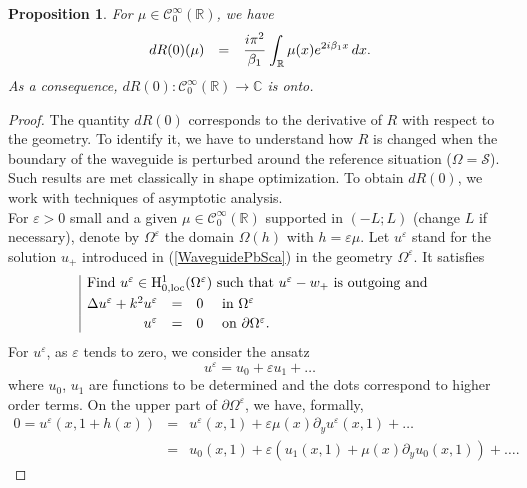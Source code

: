 \documentclass[11pt,a4paper]{report}
\newcommand{\dsp}{\displaystyle}
\newcommand{\eps}{\varepsilon}
\newcommand{\Om}{\Omega}
\newcommand{\mrm}[1]{\mathrm{#1}}
\newcommand{\Cplx}{\mathbb{C}}
\newcommand{\R}{\mathbb{R}}
\newcommand{\mH}{\mrm{H}}
\newcommand{\loc}{\mbox{\scriptsize loc}}
\newtheorem{proposition}[theorem]{Proposition}
\begin{document}
\begin{proposition}\label{PropoDiffR_Dirichlet}
For $\mu\in\mathscr{C}^\infty_0(\R)$, we have
\[
\begin{array}{rcl}
dR(0)(\mu)&=&\dsp\cfrac{i \pi^2}{\beta_1}\,\int_{\R}\mu(x) e^{2i\beta_1x}\,dx.
\end{array}
\]
As a consequence, $dR(0):\mathscr{C}^\infty_0(\R)\to\Cplx$ is onto.
\end{proposition}
\begin{proof}
The quantity $dR(0)$ corresponds to the derivative of $R$ with respect to the geometry. To identify it, we have to understand how $R$ is changed when the boundary of the waveguide is perturbed around the reference situation ($\Om=\mathcal{S}$). Such results are met classically in shape optimization. To obtain $dR(0)$, we work with techniques of asymptotic analysis.\\
\newline
For $\eps>0$ small and a given $\mu\in\mathscr{C}^\infty_0(\R)$ supported in $(-L;L)$ (change $L$ if necessary), denote by $\Om^\eps$ the domain $\Om(h)$ with $h=\eps\mu$. Let $u^\eps$ stand for the solution $u_+$ introduced in (\ref{WaveguidePbSca}) in the geometry $\Om^\eps$. It satisfies 
\begin{equation}\label{fortEpsDirichlet} 
\begin{array}{|rcll}
\multicolumn{4}{|l}{\mbox{Find }u^\eps\in\mH^1_{0,\loc}(\Om^\eps)\mbox{ such that }u^\eps-w_+\mbox{ is outgoing and } }\\[3pt]
\Delta u^\eps+k^2u^\eps&=&0&\mbox{ in }\Om^\eps \\[2pt]
u^\eps&=&0&\mbox{ on }\partial\Om^\eps.
\end{array}
\end{equation}
For $u^\eps$, as $\eps$ tends to zero, we consider the ansatz 
\begin{equation}\label{ExpansionD}
u^{\eps}=u_0+\eps u_1+\dots
\end{equation}
where $u_0$, $u_1$ are functions to be determined and the dots correspond to higher order terms. On the upper part of $\partial\Om^\eps$, we have, formally, 
\begin{equation}\label{TaylorExpansionDirichlet}
\begin{array}{rcl}
0=u^\eps(x,1+h(x))&=&u^\eps(x,1)+\eps\mu(x)\partial_yu^\eps(x,1)+\dots \\[3pt]
&=& u_0(x,1)+\eps \left(u_1(x,1)+\mu(x)\partial_yu_0(x,1)\right)+\dots .
\end{array}
\end{equation}

\end{proof}
\end{document}
